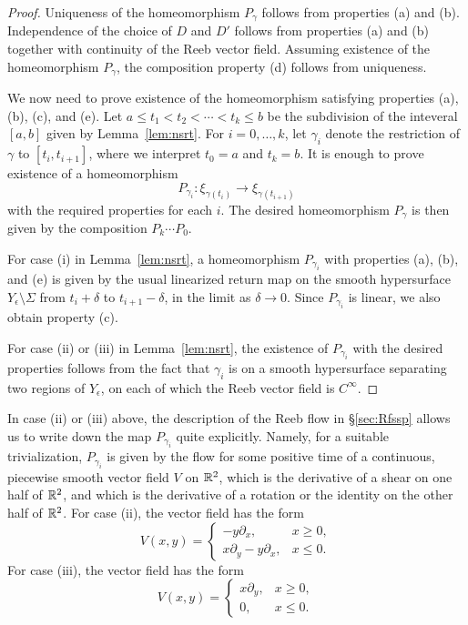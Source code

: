 \begin{proof}
Uniqueness of the homeomorphism $P_\gamma$ follows from properties (a) and (b). Independence of the choice of $D$ and $D'$ follows from properties (a) and (b) together with continuity of the Reeb vector field. Assuming existence of the homeomorphism $P_\gamma$, the composition property (d) follows from uniqueness.

We now need to prove existence of the homeomorphism satisfying properties (a), (b), (c), and (e). Let $a\le t_1<t_2<\cdots <t_k\le b$ be the subdivision of the inteveral $[a,b]$ given by Lemma~\ref{lem:nsrt}. For $i=0,\ldots,k$, let $\gamma_i$ denote the restriction of $\gamma$ to $[t_i,t_{i+1}]$, where we interpret $t_0=a$ and $t_k=b$. It is enough to prove existence of a homeomorphism
\[
P_{\gamma_i}: \xi_{\gamma(t_i)} \longrightarrow \xi_{\gamma(t_{i+1})}
\]
with the required properties for each $i$. The desired homeomorphism $P_\gamma$ is then given by the composition $P_k\cdots P_0$.

For case (i) in Lemma~\ref{lem:nsrt}, a homeomorphism $P_{\gamma_i}$ with properties (a), (b), and (e) is given by the usual linearized return map on the smooth hypersurface $Y_\epsilon\setminus\Sigma$ from $t_i+\delta$ to $t_{i+1}-\delta$, in the limit as $\delta\to 0$. Since $P_{\gamma_i}$ is linear, we also obtain property (c).

For case (ii) or (iii) in Lemma~\ref{lem:nsrt}, the existence of $P_{\gamma_i}$ with the desired properties follows from the fact that $\gamma_i$ is on a smooth hypersurface separating two regions of $Y_\epsilon$, on each of which the Reeb vector field is $C^\infty$.
\end{proof}

\begin{remark}
\label{rem:avf}
In case (ii) or (iii) above, the description of the Reeb flow in \S\ref{sec:Rfssp} allows us to write down the map $P_{\gamma_i}$ quite explicitly. Namely, for a suitable trivialization, $P_{\gamma_i}$ is given by the flow for some positive time of a continuous, piecewise smooth vector field $V$ on ${\mathbb R}^2$, which is the derivative of a shear on one half of ${\mathbb R}^2$, and which is the derivative of a rotation or the identity on the other half of ${\mathbb R}^2$. For case (ii), the vector field has the form
\begin{equation}
\label{eqn:avf2}
V(x,y) = \left\{\begin{array}{cl} -y\partial_x, & x\ge 0,\\ x\partial_y - y\partial_x, & x\le 0. \end{array}
\right.
\end{equation}
For case (iii), the vector field has the form
\begin{equation}
\label{eqn:avf3}
V(x,y) = \left\{\begin{array}{cl} x\partial_y, & x\ge 0,\\ 0, & x\le 0. \end{array}\right.
\end{equation}
\end{remark}

